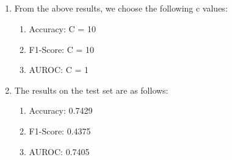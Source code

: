 \documentclass[11pt]{article}
\begin{document}
\subsection{}
\begin{enumerate}
\item From the above results, we choose the following c values:
\begin{enumerate}
\item Accuracy: C = 10
\item F1-Score: C = 10
\item AUROC: C = 1
\end{enumerate}

\setcounter{enumi}{2}
\item The results on the test set are as follows:
\begin{enumerate}
\item Accuracy: 0.7429
\item F1-Score: 0.4375
\item AUROC: 0.7405
\end{enumerate}
\end{enumerate}
\end{document}
